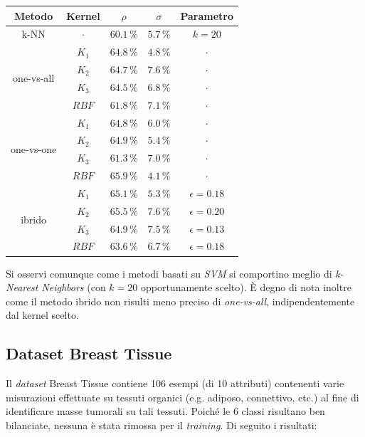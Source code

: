 \begin{center}
\begin{tabular}{ |c|c|c|c|c| } 
\hline
Metodo & Kernel & $\rho$ & $\sigma$ & Parametro \\
\hline

\multirow{1}{*}{k-NN}
& $\cdot$ & $60.1 \,\%$ & $5.7 \,\%$ & $k = 20$ \\ 
\hline

\multirow{4}{*}{one-vs-all}
& $K_1$ & $64.8 \,\%$ & $4.8 \,\%$ & $\cdot$ \\ 
& $K_2$ & $64.7 \,\%$ & $7.6 \,\%$ & $\cdot$ \\ 
& $K_3$ & $64.5 \,\%$ & $6.8 \,\%$ & $\cdot$ \\ 
& $RBF$ & $61.8 \,\%$ & $7.1 \,\%$ & $\cdot$ \\ 
\hline

\multirow{4}{*}{one-vs-one}
& $K_1$ & $64.8 \,\%$ & $6.0 \,\%$ & $\cdot$ \\ 
& $K_2$ & $64.9 \,\%$ & $5.4 \,\%$ & $\cdot$ \\ 
& $K_3$ & $61.3 \,\%$ & $7.0 \,\%$ & $\cdot$ \\ 
& $RBF$ & $65.9 \,\%$ & $4.1 \,\%$ & $\cdot$ \\ 
\hline

\multirow{4}{*}{ibrido}
& $K_1$ & $65.1 \,\%$ & $5.3 \,\%$ & $\epsilon = 0.18$ \\ 
& $K_2$ & $65.5 \,\%$ & $7.6 \,\%$ & $\epsilon = 0.20$ \\ 
& $K_3$ & $64.9 \,\%$ & $7.5 \,\%$ & $\epsilon = 0.13$ \\ 
& $RBF$ & $63.6 \,\%$ & $6.7 \,\%$ & $\epsilon = 0.18$ \\ 
\hline

\end{tabular}
\end{center}

Si osservi comunque come i metodi basati su \textit{SVM} si comportino meglio di \textit{k-Nearest Neighbors} (con $k = 20$ opportunamente scelto). È degno di nota inoltre come il metodo ibrido non risulti meno preciso di \textit{one-vs-all}, indipendentemente dal kernel scelto.

\subsection{Dataset Breast Tissue}
Il \textit{dataset} Breast Tissue contiene 106 esempi (di 10 attributi) contenenti varie misurazioni effettuate su tessuti organici (e.g. adiposo, connettivo, etc.) al fine di identificare masse tumorali su tali tessuti. 
Poiché le 6 classi risultano ben bilanciate, nessuna è stata rimossa per il \textit{training}.
Di seguito i risultati:

